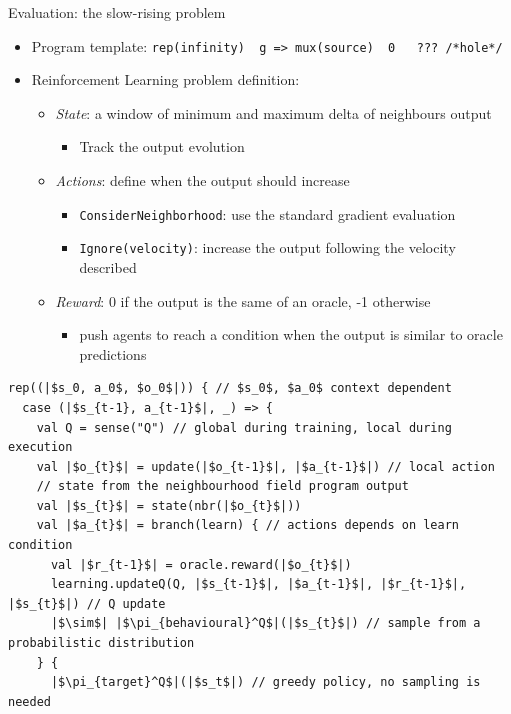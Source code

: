\documentclass[8pt, aspectratio=169, handout]{beamer}
\begin{document}
\begin{frame}{Evaluation: the slow-rising problem}
\begin{card}
\begin{itemize}
      \item Program template: \texttt{rep(infinity) { g => mux(source) { 0 } { ??? /*hole*/ } }}
      \item Reinforcement Learning problem definition:
      \begin{itemize}
        \item \emph{State}: a window of minimum and maximum delta of neighbours output
        \begin{itemize}
          \item[\faArrowRight] Track the output evolution
        \end{itemize}
        \item \emph{Actions}: define when the output should increase
        \begin{itemize}
          \item[\faArrowRight] \texttt{ConsiderNeighborhood}: use the standard gradient evaluation
          \item[\faArrowRight] \texttt{Ignore(velocity)}: increase the output following the velocity described
        \end{itemize}
        \item \emph{Reward}: 0 if the output is the same of an oracle, -1 otherwise
        \begin{itemize}
          \item[\faArrowRight] push agents to reach a condition when the output is similar to oracle predictions
        \end{itemize}
      \end{itemize}
    \end{itemize}
  \end{card}
  \begin{card}
    \begin{verbatim}
rep((|$s_0, a_0$, $o_0$|)) { // $s_0$, $a_0$ context dependent 
  case (|$s_{t-1}, a_{t-1}$|, _) => {
    val Q = sense("Q") // global during training, local during execution
    val |$o_{t}$| = update(|$o_{t-1}$|, |$a_{t-1}$|) // local action
    // state from the neighbourhood field program output
    val |$s_{t}$| = state(nbr(|$o_{t}$|))
    val |$a_{t}$| = branch(learn) { // actions depends on learn condition
      val |$r_{t-1}$| = oracle.reward(|$o_{t}$|)
      learning.updateQ(Q, |$s_{t-1}$|, |$a_{t-1}$|, |$r_{t-1}$|, |$s_{t}$|) // Q update
      |$\sim$| |$\pi_{behavioural}^Q$|(|$s_{t}$|) // sample from a probabilistic distribution
    } {
      |$\pi_{target}^Q$|(|$s_t$|) // greedy policy, no sampling is needed

\end{verbatim}
\end{card}
\end{frame}
\end{document}
